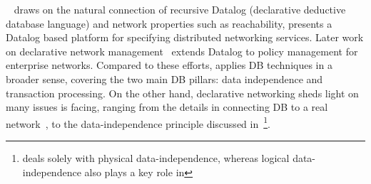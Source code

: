 ~\cite{declarative-networking,p2}
draws on the natural connection of recursive Datalog (declarative
deductive database language) and network properties such as
reachability, presents a Datalog based platform for specifying
distributed networking services. Later work on declarative network
management~\cite{practical-dn} extends Datalog to policy management for
enterprise networks. Compared to these efforts, \Sys applies DB
techniques in a broader sense, covering the two main DB pillars: data
independence and transaction processing. On the other hand,
declarative networking sheds light on many issues \Sys is facing,
ranging from the details in connecting DB to a real
network~\cite{practical-dn,declarative-networking}, to the
data-independence principle discussed
in~\cite{data-independence-network}\footnote{\cite{data-independence-network}
  deals solely with physical data-independence, whereas logical
  data-independence also plays a key role in \Sys}.


